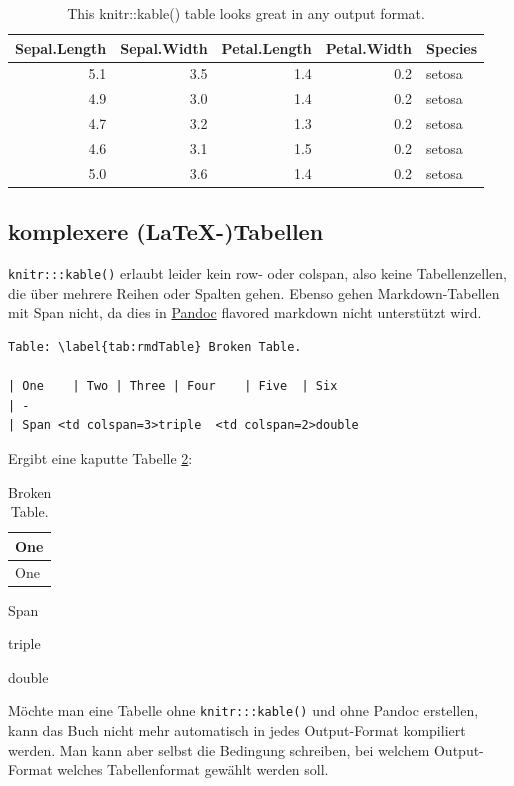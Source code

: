 \documentclass[]{book}
\theoremstyle{definition}
\theoremstyle{definition}
\theoremstyle{remark}
\begin{document}
\begin{table}

\caption{\label{tab:knitrTable}This knitr::kable() table looks great in any output format.}
\centering
\begin{tabular}[t]{rrrrl}
\toprule
Sepal.Length & Sepal.Width & Petal.Length & Petal.Width & Species\\
\midrule
5.1 & 3.5 & 1.4 & 0.2 & setosa\\
4.9 & 3.0 & 1.4 & 0.2 & setosa\\
4.7 & 3.2 & 1.3 & 0.2 & setosa\\
4.6 & 3.1 & 1.5 & 0.2 & setosa\\
5.0 & 3.6 & 1.4 & 0.2 & setosa\\
\bottomrule
\end{tabular}
\end{table}

\subsection{komplexere (LaTeX-)Tabellen}\label{complexTables}

\texttt{knitr:::kable()} erlaubt leider kein row- oder colspan, also
keine Tabellenzellen, die über mehrere Reihen oder Spalten gehen. Ebenso
gehen Markdown-Tabellen mit Span nicht, da dies in
\href{http://www.pandoc.org/MANUAL.html\#tables}{Pandoc} flavored
markdown nicht unterstützt wird.

\begin{verbatim}
Table: \label{tab:rmdTable} Broken Table.

| One    | Two | Three | Four    | Five  | Six 
| -
| Span <td colspan=3>triple  <td colspan=2>double
\end{verbatim}

Ergibt eine kaputte Tabelle \ref{tab:rmdTable}:

\begin{longtable}[]{@{}l@{}}
\caption{\label{tab:rmdTable}Broken Table.}\tabularnewline
\toprule
One\tabularnewline
\midrule
\endfirsthead
\toprule
One\tabularnewline
\midrule
\endhead
\bottomrule
\end{longtable}

\textbar{} Span

triple

double

Möchte man eine Tabelle ohne \texttt{knitr:::kable()} und ohne Pandoc
erstellen, kann das Buch nicht mehr automatisch in jedes Output-Format
kompiliert werden. Man kann aber selbst die Bedingung schreiben, bei
welchem Output-Format welches Tabellenformat gewählt werden soll.
\end{document}
